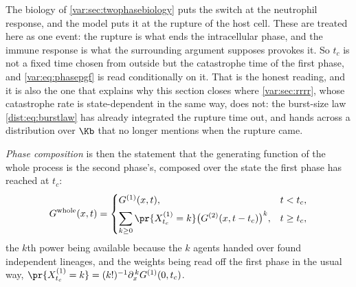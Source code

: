 The biology of \cref{var:sec:twophasebiology} puts the switch at the
neutrophil response, and the model puts it at the rupture of the host cell.
These are treated here as one event: the rupture is what ends the
intracellular phase, and the immune response is what the surrounding argument
supposes provokes it. So $t_c$ is not a fixed time chosen from outside but the
catastrophe time of the first phase, and \cref{var:eq:phasepgf} is read
conditionally on it. That is the honest reading, and it is also the one that
explains why this section closes where \cref{var:sec:rrrr}, whose catastrophe
rate is state-dependent in the same way, does not: the burst-size law
\cref{dist:eq:burstlaw} has already integrated the rupture time out, and hands
across a distribution over $\Kb$ that no longer mentions when the rupture
came.

\emph{Phase composition} is then the statement that the generating function
of the whole process is the second phase's, composed over the state the first
phase has reached at $t_c$:
\begin{equation}
G^{\text{whole}}(x,t)=
\begin{cases}
G^{(1)}(x,t), & t<t_c,\\[4pt]
\displaystyle\sum_{k\ge0}\pr{X^{(1)}_{t_c}=k}
\bigl(G^{(2)}(x,t-t_c)\bigr)^{k}, & t\ge t_c,
\end{cases}
\label{var:eq:phasepgf}
\end{equation}
the $k$th power being available because the $k$ agents handed over found
independent lineages, and the weights being read off the first phase in the
usual way, $\pr{X^{(1)}_{t_c}=k}=(k!)^{-1}\partial_x^{\,k}G^{(1)}(0,t_c)$.

